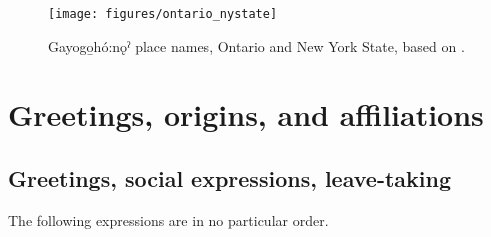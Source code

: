 \begin{figure}[p]
\texttt{[image: figures/ontario\_nystate]}
\caption{Gayogo̱hó:nǫˀ place names, Ontario and New York State, based on \citep[37]{mithun_watewayestanih_1984}.}\label{map:place.names}
\end{figure}
\clearpage


\begin{multicols}{2}
   
   
   
    

\end{multicols}



\section{Greetings, origins, and affiliations} \label{ch:greetings, origins, and affiliations}

\subsection{Greetings, social expressions, leave-taking}
The following expressions are in no particular order.

